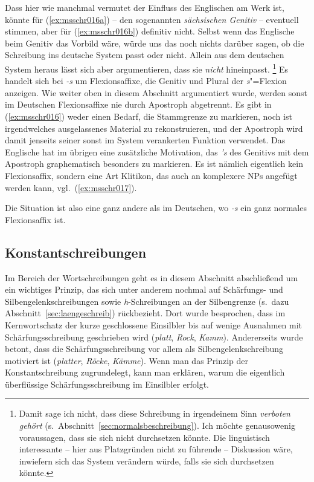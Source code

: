 Dass hier wie manchmal vermutet der Einfluss des Englischen am Werk ist, könnte für (\ref{ex:msschr016a}) -- den sogenannten \textit{sächsischen Genitiv} -- eventuell stimmen, aber für (\ref{ex:msschr016b}) definitiv nicht.
Selbst wenn das Englische beim Genitiv das Vorbild wäre, würde uns das noch nichts darüber sagen, ob die Schreibung ins deutsche System passt oder nicht.
Allein aus dem deutschen System heraus lässt sich aber argumentieren, dass sie \textit{nicht} hineinpasst.%
\footnote{Damit sage ich nicht, dass diese Schreibung in irgendeinem Sinn \textit{verboten gehört} (s.\ Abschnitt~\ref{sec:normalsbeschreibung}).
Ich möchte genausowenig voraussagen, dass sie sich nicht durchsetzen könnte.
Die linguistisch interessante -- hier aus Platzgründen nicht zu führende -- Diskussion wäre, inwiefern sich das System verändern würde, falls sie sich durchsetzen könnte.}
Es handelt sich bei \textit{-s} um Flexionsaffixe, die Genitiv und Plural der \textit{s}"=Flexion anzeigen.
Wie weiter oben in diesem Abschnitt argumentiert wurde, werden sonst im Deutschen Flexionsaffixe nie durch Apostroph abgetrennt.
Es gibt in (\ref{ex:msschr016}) weder einen Bedarf, die Stammgrenze zu markieren, noch ist irgendwelches ausgelassenes Material zu rekonstruieren, und der Apostroph wird damit jenseits seiner sonst im System verankerten Funktion verwendet.
Das Englische hat im übrigen eine zusätzliche Motivation, das \textit{'s} des Genitivs mit dem Apostroph graphematisch besonders zu markieren.
Es ist nämlich eigentlich kein Flexionsaffix, sondern eine Art Klitikon, das auch an komplexere NPs angefügt werden kann, vgl.\ (\ref{ex:msschr017}).

\begin{exe}
  \ex\label{ex:msschr017} 
  \begin{xlist}
  \end{xlist}
\end{exe}

Die Situation ist also eine ganz andere als im Deutschen, wo \textit{-s} ein ganz normales Flexionsaffix ist.

\subsection{Konstantschreibungen}

\label{sec:konstanz}

Im Bereich der Wortschreibungen geht es in diesem Abschnitt abschließend um ein wichtiges Prinzip, das sich unter anderem nochmal auf Schärfungs- und Silbengelenkschreibungen sowie \textit{h}-Schreibungen an der Silbengrenze (s.\ dazu Abschnitt~\ref{sec:laengeschreib}) rückbezieht.
Dort wurde besprochen, dass im Kernwortschatz der kurze geschlossene Einsilbler bis auf wenige Ausnahmen mit Schärfungsschreibung geschrieben wird (\textit{platt}, \textit{Rock}, \textit{Kamm}).
Andererseits wurde betont, dass die Schärfungsschreibung vor allem als Silbengelenkschreibung motiviert ist (\textit{platter}, \textit{Röcke}, \textit{Kämme}).
Wenn man das Prinzip der Konstantschreibung zugrundelegt, kann man erklären, warum die eigentlich überflüssige Schärfungsschreibung im Einsilbler erfolgt.

